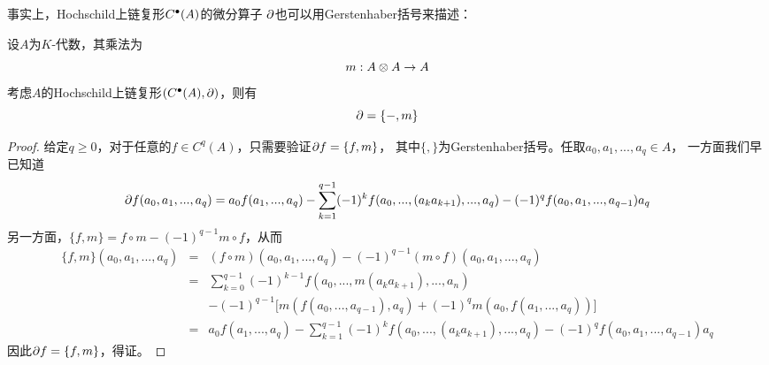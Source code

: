 事实上，Hochschild上链复形$C^{\bullet}(A)$的微分算子
$\partial$也可以用Gerstenhaber括号来描述：
\begin{lemma}设$A$为$K$-代数，其乘法为
$$m:A\otimes A\to A$$
考虑$A$的Hochschild上链复形$(C^{\bullet}(A),\partial)$，则有
$$\partial=\{-,m\}$$
\end{lemma}
\begin{proof}
给定$q\geq 0$，对于任意的$f\in C^q(A)$，只需要验证$\partial f=\{f,m\}$，
其中$\{,\}$为Gerstenhaber括号。任取$a_0,a_1,...,a_q\in A$，
一方面我们早已知道
\begin{eqnarray*}
  \partial f(a_0,a_1,...,a_q)=
  a_0f(a_1,...,a_q)
  -\sum_{k=1}^{q-1}(-1)^k
     f(a_0,...,(a_ka_{k+1}),...,a_q)
  -(-1)^qf(a_0,a_1,...,a_{q-1})a_q
\end{eqnarray*}
另一方面，$\{f,m\}=f\circ m-(-1)^{q-1}m\circ f$，从而
\begin{eqnarray*}
     \{f,m\}(a_0,a_1,...,a_q)
&=&
     (f\circ m)(a_0,a_1,...,a_q)
     -(-1)^{q-1}(m\circ f)(a_0,a_1,...,a_q)\\
&=&
     \sum_{k=0}^{q-1}(-1)^{k-1}
       f(a_0,...,m(a_ka_{k+1}),...,a_n)\\
& &
    -(-1)^{q-1}
     \big[
       m(f(a_0,...,a_{q-1}),a_q)
      +(-1)^qm(a_0,f(a_1,...,a_q))
     \big]\\
&=&
     a_0f(a_1,...,a_q)
    -\sum_{k=1}^{q-1}(-1)^k
     f(a_0,...,(a_ka_{k+1}),...,a_q)
    -(-1)^qf(a_0,a_1,...,a_{q-1})a_q
\end{eqnarray*}
因此$\partial f=\{f,m\}$，得证。
\end{proof}



